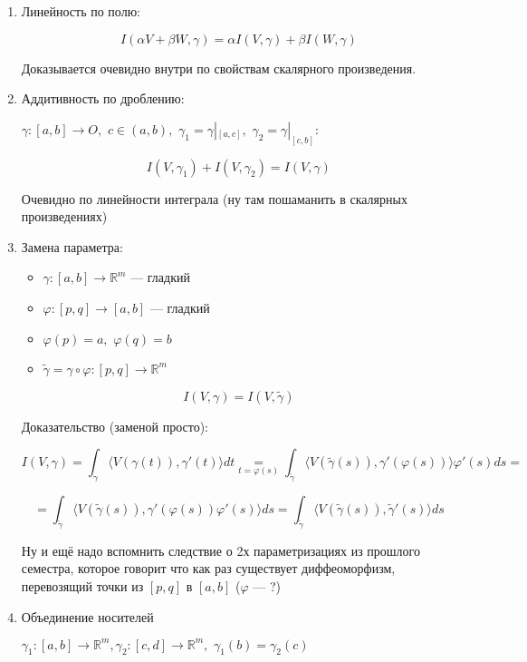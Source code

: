 \documentclass{article}
\def\dbl{\,\,}
\def\sk#1#2{\langle #1, #2 \rangle}
\begin{document}
\begin{enumerate}
    \item Линейность по полю:
    
    \[I(\alpha V + \beta W, \gamma) = \alpha I(V, \gamma) + \beta I(W, \gamma)\]

    Доказывается очевидно внутри по свойствам скалярного произведения.

    \item Аддитивность по дроблению:
    
    $\gamma: [a, b] \rightarrow O, \dbl c \in (a, b), \dbl \gamma_1 = \gamma|_{[a, c]}, \dbl \gamma_2 = \gamma|_{[c, b]}$:

    \[I(V, \gamma_1) + I(V, \gamma_2) = I(V, \gamma)\]

    Очевидно по линейности интеграла (ну там пошаманить в скалярных произведениях)

    \item Замена параметра:
    
    \begin{itemize}
        \item $\gamma: [a, b] \rightarrow \mathbb{R}^m$ --- гладкий
        \item $\varphi: [p, q] \rightarrow [a, b]$ --- гладкий
        \item $\varphi(p) = a, \dbl \varphi(q) = b$
        \item $\tilde{\gamma} = \gamma \circ \varphi: [p, q] \rightarrow \mathbb{R}^m$
    \end{itemize}

    \[I(V, \gamma) = I(V, \tilde{\gamma})\]

    Доказательство (заменой просто):

    \[I(V, \gamma) = \int_{\gamma} \sk{V(\gamma(t))}{\gamma'(t)} dt \underset{t = \varphi(s)}{=} \int_{\tilde{\gamma}} \sk{V(\tilde{\gamma}(s))}{\gamma'(\varphi(s))} \varphi'(s)ds = \] 
    
    \[ = \int_{\tilde{\gamma}} \sk{V(\tilde{\gamma}(s))}{\gamma'(\varphi(s))\varphi'(s)}ds = \int_{\tilde{\gamma}} \sk{V(\tilde{\gamma}(s))}{\tilde{\gamma}'(s)}ds\]

    Ну и ещё надо вспомнить следствие о 2х параметризациях из прошлого семестра, которое говорит что как раз существует диффеоморфизм, перевозящий точки из $[p, q]$ в $[a, b]$ ($\varphi$ --- ?)

    \item Объединение носителей
    
    $\gamma_1: [a, b] \rightarrow \mathbb{R}^m, \gamma_2: [c, d] \rightarrow \mathbb{R}^m, \dbl \gamma_1(b) = \gamma_2(c)$


\end{enumerate}
\end{document}
